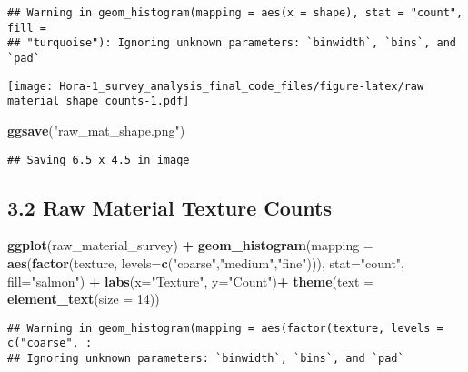 \documentclass[
]{article}
\newenvironment{Shaded}{\begin{snugshade}}{\end{snugshade}}
\newcommand{\AttributeTok}[1]{\textcolor[rgb]{0.13,0.29,0.53}{#1}}
\newcommand{\DecValTok}[1]{\textcolor[rgb]{0.00,0.00,0.81}{#1}}
\newcommand{\FunctionTok}[1]{\textcolor[rgb]{0.13,0.29,0.53}{\textbf{#1}}}
\newcommand{\NormalTok}[1]{#1}
\newcommand{\SpecialCharTok}[1]{\textcolor[rgb]{0.81,0.36,0.00}{\textbf{#1}}}
\newcommand{\StringTok}[1]{\textcolor[rgb]{0.31,0.60,0.02}{#1}}
\begin{document}
\begin{verbatim}
## Warning in geom_histogram(mapping = aes(x = shape), stat = "count", fill =
## "turquoise"): Ignoring unknown parameters: `binwidth`, `bins`, and `pad`
\end{verbatim}

\texttt{[image: Hora-1\_survey\_analysis\_final\_code\_files/figure-latex/raw material shape counts-1.pdf]}

\begin{Shaded}
\begin{Highlighting}[]
\FunctionTok{ggsave}\NormalTok{(}\StringTok{"raw\_mat\_shape.png"}\NormalTok{)}
\end{Highlighting}
\end{Shaded}

\begin{verbatim}
## Saving 6.5 x 4.5 in image
\end{verbatim}

\hypertarget{raw-material-texture-counts}{%
\subsection{3.2 Raw Material Texture
Counts}\label{raw-material-texture-counts}}

\begin{Shaded}
\begin{Highlighting}[]
\FunctionTok{ggplot}\NormalTok{(raw\_material\_survey) }\SpecialCharTok{+}
  \FunctionTok{geom\_histogram}\NormalTok{(}\AttributeTok{mapping =} \FunctionTok{aes}\NormalTok{(}\FunctionTok{factor}\NormalTok{(texture, }\AttributeTok{levels=}\FunctionTok{c}\NormalTok{(}\StringTok{"coarse"}\NormalTok{,}\StringTok{"medium"}\NormalTok{,}\StringTok{"fine"}\NormalTok{))), }\AttributeTok{stat=}\StringTok{"count"}\NormalTok{, }\AttributeTok{fill=}\StringTok{"salmon"}\NormalTok{) }\SpecialCharTok{+}
  \FunctionTok{labs}\NormalTok{(}\AttributeTok{x=}\StringTok{"Texture"}\NormalTok{, }\AttributeTok{y=}\StringTok{"Count"}\NormalTok{)}\SpecialCharTok{+}
  \FunctionTok{theme}\NormalTok{(}\AttributeTok{text =} \FunctionTok{element\_text}\NormalTok{(}\AttributeTok{size =} \DecValTok{14}\NormalTok{))}
\end{Highlighting}
\end{Shaded}

\begin{verbatim}
## Warning in geom_histogram(mapping = aes(factor(texture, levels = c("coarse", :
## Ignoring unknown parameters: `binwidth`, `bins`, and `pad`
\end{verbatim}
\end{document}
